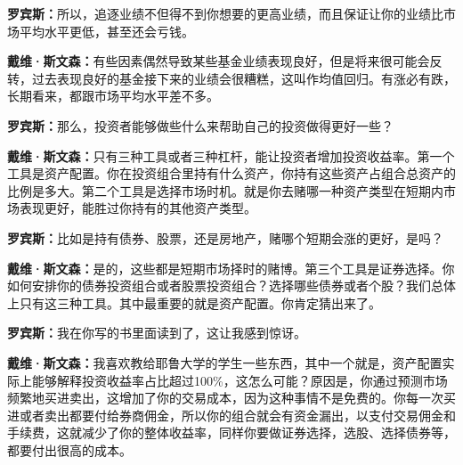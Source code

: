 \begin{BookQuote}
\textbf{罗宾斯：}所以，追逐业绩不但得不到你想要的更高业绩，而且保证让你的业绩比市场平均水平更低，甚至还会亏钱。
\end{BookQuote}

\begin{BookQuote}
\textbf{戴维·斯文森：}有些因素偶然导致某些基金业绩表现良好，但是将来很可能会反转，过去表现良好的基金接下来的业绩会很糟糕，这叫作均值回归。有涨必有跌，长期看来，都跟市场平均水平差不多。
\end{BookQuote}

\begin{BookQuote}
\textbf{罗宾斯：}那么，投资者能够做些什么来帮助自己的投资做得更好一些？
\end{BookQuote}

\begin{BookQuote}
\textbf{戴维·斯文森：}只有三种工具或者三种杠杆，能让投资者增加投资收益率。第一个工具是资产配置。你在投资组合里持有什么资产，你持有这些资产占组合总资产的比例是多大。第二个工具是选择市场时机。就是你去赌哪一种资产类型在短期内市场表现更好，能胜过你持有的其他资产类型。
\end{BookQuote}

\begin{BookQuote}
\textbf{罗宾斯：}比如是持有债券、股票，还是房地产，赌哪个短期会涨的更好，是吗？
\end{BookQuote}

\begin{BookQuote}
\textbf{戴维·斯文森：}是的，这些都是短期市场择时的赌博。第三个工具是证券选择。你如何安排你的债券投资组合或者股票投资组合？选择哪些债券或者个股？我们总体上只有这三种工具。其中最重要的就是资产配置。你肯定猜出来了。
\end{BookQuote}

\begin{BookQuote}
\textbf{罗宾斯：}我在你写的书里面读到了，这让我感到惊讶。
\end{BookQuote}

\begin{BookQuote}
\textbf{戴维·斯文森：}我喜欢教给耶鲁大学的学生一些东西，其中一个就是，资产配置实际上能够解释投资收益率占比超过100\%，这怎么可能？原因是，你通过预测市场频繁地买进卖出，这增加了你的交易成本，因为这种事情不是免费的。你每一次买进或者卖出都要付给券商佣金，所以你的组合就会有资金漏出，以支付交易佣金和手续费，这就减少了你的整体收益率，同样你要做证券选择，选股、选择债券等，都要付出很高的成本。
\end{BookQuote}

